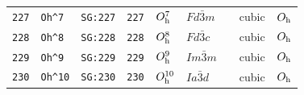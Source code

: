 \documentclass[fleqn,10pt]{jsarticle}
\begin{document}
\begin{center}
\begin{longtable}{lllllllll}
\texttt{227} & \texttt{Oh^7} & \texttt{SG:227} & \texttt{227} & $O_{\rm h}^{7}$ & $Fd\bar{3}m$ &  & cubic & $O_{\rm h}$ \\
\texttt{228} & \texttt{Oh^8} & \texttt{SG:228} & \texttt{228} & $O_{\rm h}^{8}$ & $Fd\bar{3}c$ &  & cubic & $O_{\rm h}$ \\
\texttt{229} & \texttt{Oh^9} & \texttt{SG:229} & \texttt{229} & $O_{\rm h}^{9}$ & $Im\bar{3}m$ &  & cubic & $O_{\rm h}$ \\
\texttt{230} & \texttt{Oh^10} & \texttt{SG:230} & \texttt{230} & $O_{\rm h}^{10}$ & $Ia\bar{3}d$ &  & cubic & $O_{\rm h}$ \\
\end{longtable}
\end{center}
\end{document}

